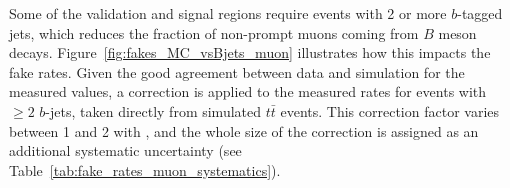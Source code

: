 \begin{table}[htb!]
\def\arraystretch{1.15}
\def\arraystretch{1.15}
\centering
{}


\caption{Muon fake rate measured in data and the associated statistical uncertainty. 
The systematic uncertainty originating from the subtraction of ``backgrounds'' with only prompt leptons is also displayed. }
\label{table:fake_rates_muon}
\end{table}

Some of the validation and signal regions require events with 2 or more $b$-tagged jets, 
which reduces the fraction of non-prompt muons coming from $B$ meson decays. 
Figure~\ref{fig:fakes_MC_vsBjets_muon} illustrates how this impacts 
the fake rates. 
Given the good agreement between data and simulation for the measured values, 
a correction is applied to the measured rates for events with $\ge 2$ $b$-jets, 
taken directly from simulated $t\bar t$ events. 
This correction factor varies between 1 and 2 with \pt, 
and the whole size of the correction is assigned as an additional systematic uncertainty (see Table~\ref{tab:fake_rates_muon_systematics}). 

